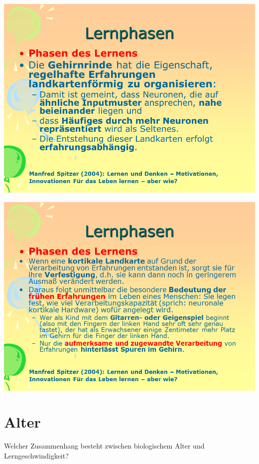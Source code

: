 \documentclass[
  letterpaper,
]{scrbook}
\begin{document}
\includegraphics[width=1\textwidth,height=\textheight]{./pictures/neuro/Diapozitiv66.PNG}

\includegraphics[width=1\textwidth,height=\textheight]{./pictures/neuro/Diapozitiv67.PNG}

\hypertarget{alter}{%
\section{Alter}\label{alter}}

Welcher Zusammenhang besteht zwischen biologischem Alter und
Lerngeschwindigkeit?
\end{document}
